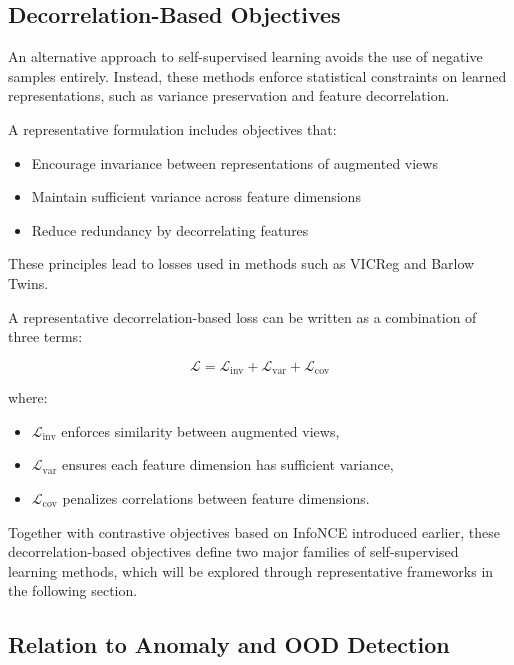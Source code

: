 \documentclass{article}
\begin{document}
\subsection{Decorrelation-Based Objectives}

An alternative approach to self-supervised learning avoids the use of negative samples entirely. Instead, these methods enforce statistical constraints on learned representations, such as variance preservation and feature decorrelation.

A representative formulation includes objectives that:

\begin{itemize}
\item Encourage invariance between representations of augmented views
\item Maintain sufficient variance across feature dimensions
\item Reduce redundancy by decorrelating features
\end{itemize}

These principles lead to losses used in methods such as VICReg and Barlow Twins.

A representative decorrelation-based loss can be written as a combination of three terms:

\begin{equation}
\mathcal{L} = \mathcal{L}_{\text{inv}} + \mathcal{L}_{\text{var}} + \mathcal{L}_{\text{cov}}
\end{equation}

where:
\begin{itemize}
\item $\mathcal{L}_{\text{inv}}$ enforces similarity between augmented views,
\item $\mathcal{L}_{\text{var}}$ ensures each feature dimension has sufficient variance,
\item $\mathcal{L}_{\text{cov}}$ penalizes correlations between feature dimensions.
\end{itemize}

Together with contrastive objectives based on InfoNCE introduced earlier, these decorrelation-based objectives define two major families of self-supervised learning methods, which will be explored through representative frameworks in the following section.

\subsection{Relation to Anomaly and OOD Detection}
\end{document}
